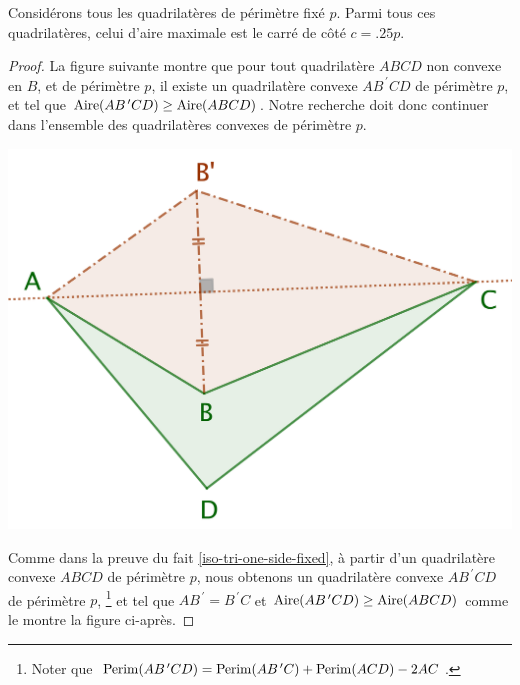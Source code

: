\begin{fact}
	Considérons tous les quadrilatères de périmètre fixé $p$. Parmi tous ces quadrilatères, celui d'aire maximale est le carré de côté $c = \num{.25} p$.
\end{fact}


\begin{proof}
	La figure suivante montre que pour tout quadrilatère $ABCD$ non convexe en $B$, et de périmètre $p$, il existe un quadrilatère convexe $AB^{\,\prime}CD$ de périmètre $p$, et tel que $\mathrm{Aire}(AB^{\,\prime}CD) \geq \mathrm{Aire}(ABCD)$.
	Notre recherche doit donc continuer dans l'ensemble des quadrilatères convexes de périmètre $p$.

	\begin{center}
		\includegraphics[scale=.4]{content/quadrilateral/quadrilateral-non-convex.png}
	\end{center}
	
	
	Comme dans la preuve du fait \ref{iso-tri-one-side-fixed}, à partir d'un quadrilatère convexe $ABCD$ de périmètre $p$, nous obtenons un quadrilatère convexe $AB^{\,\prime}CD$ de périmètre $p$,%
	\footnote{
		Noter que
		$\mathrm{Perim}(AB^{\,\prime}CD) = \mathrm{Perim}(AB^{\,\prime}C) + \mathrm{Perim}(ACD) - 2 AC$.
	}
	et tel que $AB^{\,\prime} = B^{\,\prime}C$ et $\mathrm{Aire}(AB^{\,\prime}CD) \geq \mathrm{Aire}(ABCD)$ comme le montre la figure ci-après. 


\end{proof}
